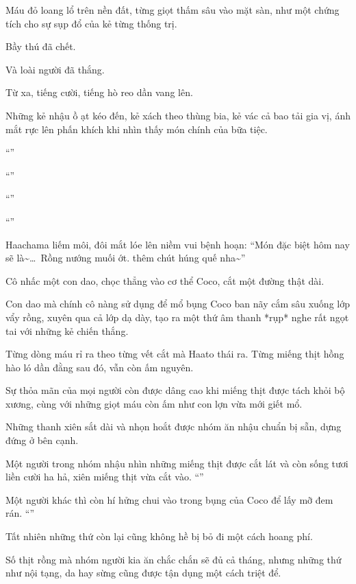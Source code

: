 \documentclass[../main.tex]{subfiles}
\begin{document}
Máu đỏ loang lổ trên nền đất, từng giọt thấm sâu vào mặt sàn, như một chứng tích cho sự sụp đổ của kẻ từng thống trị.

Bầy thú đã chết.

Và loài người đã thắng.

Từ xa, tiếng cười, tiếng hò reo dần vang lên.

Những kẻ nhậu ồ ạt kéo đến, kẻ xách theo thùng bia, kẻ vác cả bao tải gia vị, ánh mắt rực lên phấn khích khi nhìn thấy món chính của bữa tiệc.

``\textbf{}''

``\textbf{}''

``\textbf{}''

``\textbf{}''

Haachama liếm môi, đôi mắt lóe lên niềm vui bệnh hoạn: ``Món đặc biệt hôm nay sẽ là\~{}\dots\ Rồng nướng muối ớt. thêm chút húng quế nha\~{}''

Cô nhấc một con dao, chọc thẳng vào cơ thể Coco, cắt một đường thật dài.

Con dao mà chính cô nàng sử dụng để mổ bụng Coco ban nãy cắm sâu xuống lớp vẩy rồng, xuyên qua cả lớp dạ dày, tạo ra một thứ âm thanh *rụp* nghe rất ngọt tai với những kẻ chiến thắng.

Từng dòng máu rỉ ra theo từng vết cắt mà Haato thái ra. Từng miếng thịt hồng hào ló dần đằng sau đó, vẫn còn ấm nguyên.

Sự thỏa mãn của mọi người còn được dâng cao khi miếng thịt được tách khỏi bộ xương, cùng với những giọt máu còn ấm như con lợn vừa mới giết mổ.

Những thanh xiên sắt dài và nhọn hoắt được nhóm ăn nhậu chuẩn bị sẵn, dựng đứng ở bên cạnh.

Một người trong nhóm nhậu nhìn những miếng thịt được cắt lát và còn sống tươi liền cười ha hả, xiên miếng thịt vừa cắt vào. ``\textbf{}''

Một người khác thì còn hí hửng chui vào trong bụng của Coco để lấy mỡ đem rán. ``\textbf{}''

Tất nhiên những thứ còn lại cũng không hề bị bỏ đi một cách hoang phí.

Số thịt rồng mà nhóm người kia ăn chắc chắn sẽ đủ cả tháng, nhưng những thứ như nội tạng, da hay sừng cũng được tận dụng một cách triệt để.
\end{document}

